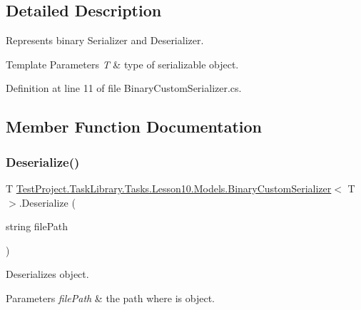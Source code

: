 \subsection{Detailed Description}
Represents binary Serializer and Deserializer. 


\begin{DoxyTemplParams}{Template Parameters}
{\em T} & type of serializable object.\\
\hline
\end{DoxyTemplParams}


Definition at line 11 of file Binary\+Custom\+Serializer.\+cs.



\subsection{Member Function Documentation}
\mbox{\label{class_test_project_1_1_task_library_1_1_tasks_1_1_lesson10_1_1_models_1_1_binary_custom_serializer_aa90860932ba8619bacf607b4be2c4b6e}} 
\subsubsection{\texorpdfstring{Deserialize()}{Deserialize()}}
{\footnotesize\ttfamily T \mbox{\hyperlink{class_test_project_1_1_task_library_1_1_tasks_1_1_lesson10_1_1_models_1_1_binary_custom_serializer}{Test\+Project.\+Task\+Library.\+Tasks.\+Lesson10.\+Models.\+Binary\+Custom\+Serializer}}$<$ T $>$.Deserialize (\begin{DoxyParamCaption}\item[{string}]{file\+Path }\end{DoxyParamCaption})}



Deserializes object. 


\begin{DoxyParams}{Parameters}
{\em file\+Path} & the path where is object.\\
\hline
\end{DoxyParams}


